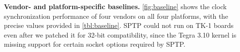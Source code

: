 





\textbf{Vendor- and platform-specific baselines.}
\cref{fig:baseline} shows the clock synchronization performance of four vendors
on all four platforms, with the precise values provided in \cref{tbl:baseline}.
SPTP could not run on TK-1 boards even after we patched it for 32-bit
compatibility, since the Tegra 3.10 kernel is missing support for certain
socket options required by SPTP.


